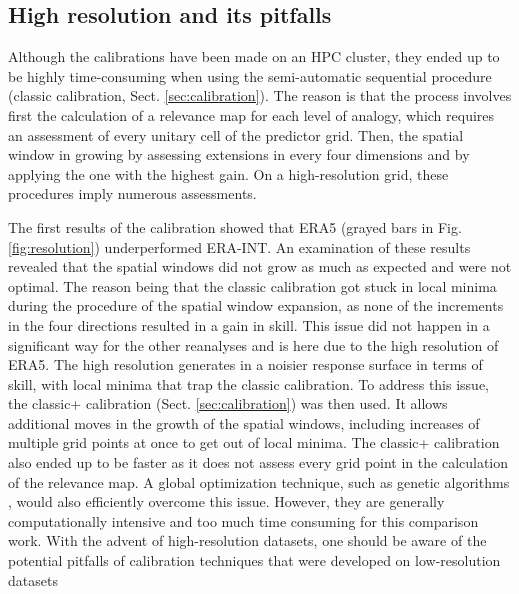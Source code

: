 \documentclass[alpha-refs]{wiley-article}
\begin{document}
\subsection{High resolution and its pitfalls}
\label{sec:results_hires}

Although the calibrations have been made on an HPC cluster, they ended up to be highly time-consuming when using the semi-automatic sequential procedure (classic calibration, Sect. \ref{sec:calibration}). The reason is that the process involves first the calculation of a relevance map for each level of analogy, which requires an assessment of every unitary cell of the predictor grid. Then, the spatial window in growing by assessing extensions in every four dimensions and by applying the one with the highest gain. On a high-resolution grid, these procedures imply numerous assessments.

The first results of the calibration showed that ERA5 (grayed bars in Fig. \ref{fig:resolution}) underperformed ERA-INT. An examination of these results revealed that the spatial windows did not grow as much as expected and were not optimal. The reason being that the classic calibration got stuck in local minima during the procedure of the spatial window expansion, as none of the increments in the four directions resulted in a gain in skill. This issue did not happen in a significant way for the other reanalyses and is here due to the high resolution of ERA5. The high resolution generates in a noisier response surface in terms of skill, with local minima that trap the classic calibration. To address this issue, the classic+ calibration (Sect. \ref{sec:calibration}) was then used. It allows additional moves in the growth of the spatial windows, including increases of multiple grid points at once to get out of local minima. The classic+ calibration also ended up to be faster as it does not assess every grid point in the calculation of the relevance map. A global optimization technique, such as genetic algorithms \citep{Horton2017a}, would also efficiently overcome this issue. However, they are generally computationally intensive and too much time consuming for this comparison work. With the advent of high-resolution datasets, one should be aware of the potential pitfalls of calibration techniques that were developed on low-resolution datasets
\end{document}
